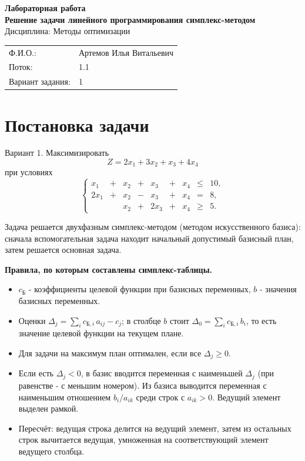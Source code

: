\documentclass[a4paper,12pt]{article}
\begin{document}
\begin{center}
{\large\bfseries Лабораторная работа\\[2pt]
Решение задачи линейного программирования симплекс-методом}\\[4pt]
Дисциплина: Методы оптимизации
\end{center}

\begin{tabular}{@{}ll}
Ф.И.О.: & Артемов Илья Витальевич\\
Поток: & 1.1\\
Вариант задания: & 1\\
\end{tabular}

\section{Постановка задачи}

Вариант 1. Максимизировать
\[
Z = 2x_1 + 3x_2 + x_3 + 4x_4
\]
при условиях
\[
\left\{
\begin{array}{rcrcrcrcr}
x_1 &+& x_2 &+& x_3 &+& x_4 &\le& 10,\\
2x_1 &+& x_2 &-& x_3 &+& x_4 &=& 8,\\
 & & x_2 &+& 2x_3 &+& x_4 &\ge& 5.
\end{array}
\right.
\]

Задача решается двухфазным симплекс-методом (методом искусственного базиса): сначала вспомогательная задача находит начальный допустимый базисный план, затем решается основная задача.

\textbf{Правила, по которым составлены симплекс-таблицы.}
\begin{itemize}
\item $c_{\text{Б}}$ - коэффициенты целевой функции при базисных переменных, $b$ - значения базисных переменных.
\item Оценки $\Delta_j = \sum_i c_{\text{Б},i}\,a_{ij} - c_j$; в столбце $b$ стоит $\Delta_0 = \sum_i c_{\text{Б},i}\,b_i$, то есть значение целевой функции на текущем плане.
\item Для задачи на максимум план оптимален, если все $\Delta_j \ge 0$.
\item Если есть $\Delta_j < 0$, в базис вводится переменная с наименьшей $\Delta_j$ (при равенстве - с меньшим номером). Из базиса выводится переменная с наименьшим отношением $b_i/a_{ik}$ среди строк с $a_{ik} > 0$. Ведущий элемент выделен рамкой.
\item Пересчёт: ведущая строка делится на ведущий элемент, затем из остальных строк вычитается ведущая, умноженная на соответствующий элемент ведущего столбца.
\end{itemize}
\end{document}
